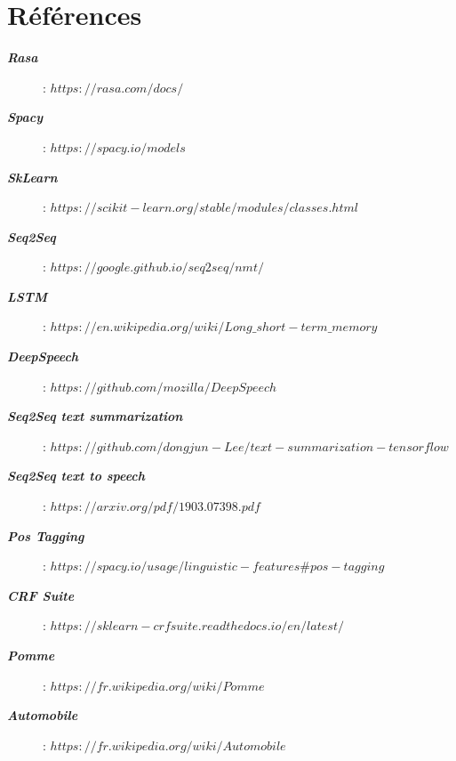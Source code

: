 
\part{Références}

\newcommand{\reff}[2]{\item[\textbf{\textit{#1}}]: \textit{#2}}

\begin{description}
\reff{Rasa}{$https://rasa.com/docs/$}
\reff{Spacy}{$https://spacy.io/models$}
\reff{SkLearn}{$https://scikit-learn.org/stable/modules/classes.html$}
\reff{Seq2Seq}{$https://google.github.io/seq2seq/nmt/$}
\reff{LSTM}{$https://en.wikipedia.org/wiki/Long\_short-term\_memory$}
\reff{DeepSpeech}{$https://github.com/mozilla/DeepSpeech$}
\reff{Seq2Seq text summarization}{$https://github.com/dongjun-Lee/text-summarization-tensorflow$}
\reff{Seq2Seq text to speech}{$https://arxiv.org/pdf/1903.07398.pdf$}
\reff{Pos Tagging}{$https://spacy.io/usage/linguistic-features\#pos-tagging$}
\reff{CRF Suite}{$https://sklearn-crfsuite.readthedocs.io/en/latest/$}
\reff{Pomme}{$https://fr.wikipedia.org/wiki/Pomme$}
\reff{Automobile}{$https://fr.wikipedia.org/wiki/Automobile$}
\end{description}

	
	